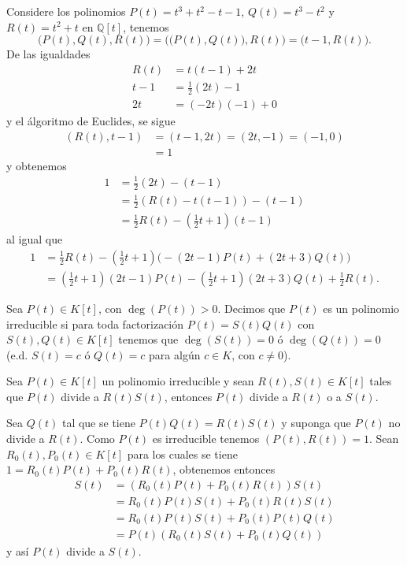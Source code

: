 \begin{ejem}
Considere los polinomios $P(t)=t^3+t^2-t-1$, $Q(t)=t^3-t^2$ y $R(t)=t^2+t$ en $\mathbb{Q}[t]$, tenemos $$\Big(P(t),Q(t),R(t)\Big)=\Big(\big(P(t),Q(t)\big),R(t)\Big)=\big(t-1,R(t)\big).$$
De las igualdades
\begin{align*}
R(t)& =t(t-1)+2t\\
t-1& =\frac{1}{2}(2t)-1\\
2t & = (-2t)(-1)+0
\end{align*}
y el \'algoritmo de Euclides, se sigue
\begin{align*}
(R(t),t-1) & =(t-1,2t) =(2t,-1) =(-1,0)\\
  & =1
\end{align*}
y obtenemos
\begin{align*}
1 &= \frac{1}{2}(2t)-(t-1)\\
   &= \frac{1}{2}(R(t)-t(t-1))-(t-1)\\
   &= \frac{1}{2}R(t)-(\frac{1}{2}t+1)(t-1)
\end{align*}
al igual que
\begin{align*}
1   &= \frac{1}{2}R(t)-(\frac{1}{2}t+1)\big(-(2t-1)P(t)+(2t+3)Q(t)\big)\\
   &= (\frac{1}{2}t+1)(2t-1)P(t)-(\frac{1}{2}t+1)(2t+3)Q(t)+\frac{1}{2}R(t).
\end{align*}
\end{ejem}

\begin{defn}
Sea $P(t)\in K[t]$, con $\deg(P(t))>0$. Decimos que $P(t)$ es un polinomio irreducible si para toda factorizaci\'on $P(t)=S(t)Q(t)$ con $S(t),Q(t)\in K[t]$ tenemos que $\deg(S(t))=0$ \'o $\deg(Q(t))=0$ (e.d. $S(t)=c$ \'o $Q(t)=c$ para alg\'un $c\in K$, con $c\ne 0$).
\end{defn}

\begin{lema}
Sea $P(t)\in K[t]$ un polinomio irreducible y sean $R(t),S(t)\in K[t]$ tales que $P(t)$ divide a $R(t)S(t)$, entonces $P(t)$ divide a $R(t)$ o a $S(t)$.
\end{lema}

\dem Sea $Q(t)$ tal que se tiene $P(t)Q(t)=R(t)S(t)$ y suponga que $P(t)$ no divide a $R(t)$. Como $P(t)$ es irreducible tenemos $(P(t),R(t))=1$. Sean $R_0(t),P_0(t)\in K[t]$ para los cuales se tiene $1=R_0(t)P(t)+P_0(t)R(t)$, obtenemos entonces
\begin{align*}
S(t) & =(R_0(t)P(t)+P_0(t)R(t))S(t)\\
& =R_0(t)P(t)S(t)+P_0(t)R(t)S(t)\\
& =R_0(t)P(t)S(t)+P_0(t)P(t)Q(t)\\
& =P(t)\left(R_0(t)S(t)+P_0(t)Q(t)\right)
\end{align*}
y as\'i $P(t)$ divide a $S(t)$.

